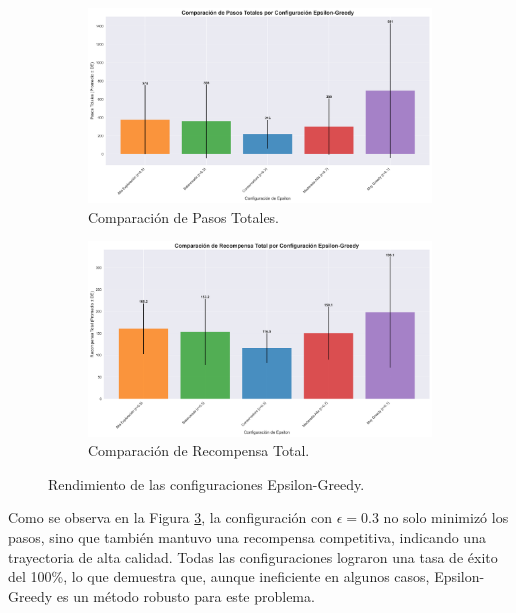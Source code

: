 \documentclass[12pt, oneside, openany]{book}
\begin{document}
\begin{figure}[H]
    \centering
    \begin{subfigure}[b]{0.49\textwidth}
        \includegraphics[width=\textwidth]{informe_visuals/epsilon_pasos_comparacion.png}
        \caption{Comparación de Pasos Totales.}
        \label{fig:epsilon_pasos}
    \end{subfigure}
    \hfill
    \begin{subfigure}[b]{0.49\textwidth}
        \includegraphics[width=\textwidth]{informe_visuals/epsilon_recompensa_comparacion.png}
        \caption{Comparación de Recompensa Total.}
        \label{fig:epsilon_recompensa}
    \end{subfigure}
    \caption{Rendimiento de las configuraciones Epsilon-Greedy.}
    \label{fig:epsilon_graphs}
\end{figure}

Como se observa en la Figura \ref{fig:epsilon_graphs}, la configuración con $\epsilon=0.3$ no solo minimizó los pasos, sino que también mantuvo una recompensa competitiva, indicando una trayectoria de alta calidad. Todas las configuraciones lograron una tasa de éxito del 100\%, lo que demuestra que, aunque ineficiente en algunos casos, Epsilon-Greedy es un método robusto para este problema.
\end{document}
